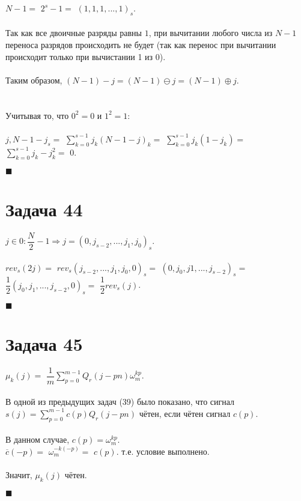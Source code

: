 \documentclass{article}
\newcommand\proofend{\begin{flushright}$\blacksquare$\end{flushright}}
\begin{document}
{$N - 1 = $
$2^s - 1 = $
$(1, 1, 1, ..., 1)_s$.\\ \\
Так как все двоичные разряды равны $1$, при вычитании любого числа из $N - 1$ переноса разрядов происходить не будет (так как перенос при вычитании происходит только при вычистании 1 из 0).\\ \\
Таким образом, $(N - 1) - j = (N - 1) \ominus j =(N - 1) \oplus j$. \\ \\ \\
Учитывая то, что $0^2 = 0$ и $1^2 = 1$: \\ \\
${j, N - 1 - j}_s = $
$\sum\limits_{k=0}^{s-1} j_k (N - 1 - j)_k = $
$\sum\limits_{k=0}^{s-1} j_k (1 - j_k) = $
$\sum\limits_{k=0}^{s-1} j_k - j_k^2 = $
$0$.
\proofend

\section*{Задача 44}
$j \in 0:\dfrac{N}{2} - 1 \Rightarrow j = (0, j_{s-2}, ..., j_1, j_0)_s$.\\ \\
$rev_s(2j) = $
$rev_s(j_{s-2},...,j_1,j_0,0)_s = $
$(0, j_0, j1, ..., j_{s-2})_s = $
$\dfrac{1}{2} (j_0, j_1, ..., j_{s-2}, 0)_s = $
$\dfrac{1}{2} rev_s(j)$.
\proofend

\section*{Задача 45}
$\mu_k(j) = $
$\dfrac{1}{m} \sum\limits_{p = 0}^{m-1}Q_r(j-pn)\omega_m^{kp}$. \\ \\
В одной из предыдущих задач (39) было показано, что сигнал\\
$s(j) = \sum\limits_{p=0}^{m-1}c(p)Q_r(j-pn)$ чётен, если чётен сигнал $c(p)$.\\ \\
В данном случае, $c(p) = \omega_m^{kp}$.\\
$\overline{c}(-p) = $
$\omega_m^{ -k(-p) } = $
$c(p)$.
т.е. условие выполнено.\\ \\
Значит, $\mu_k(j)$ чётен.

\proofend
\pagebreak

}
\end{document}
